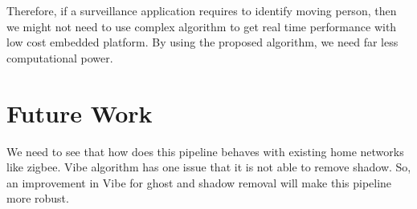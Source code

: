 \documentclass[conference]{IEEEtran}
\begin{document}
Therefore, if a surveillance application requires to identify moving person,
then we might not need to use complex algorithm to get real time
performance with low cost embedded platform. By using the proposed
algorithm, we need far less computational power.

\section{Future Work}

We need to see that how does this pipeline behaves with existing home
networks like zigbee. Vibe algorithm has one issue that it is not able to
remove shadow. So, an improvement in Vibe for ghost and shadow removal
will make this pipeline more robust.


%
%



%
%
\end{document}
